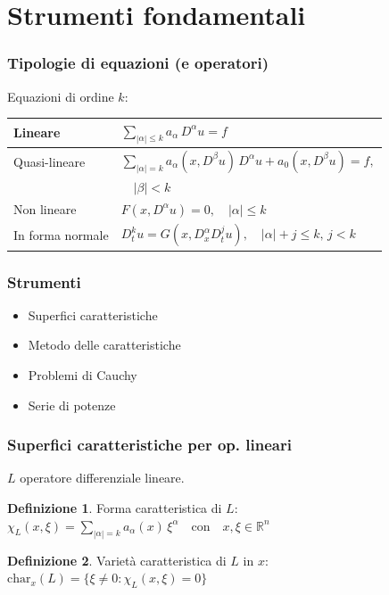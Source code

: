 \documentclass[serif,notheorems]{beamer}
\theoremstyle{definition} %
\newtheorem{definition}{Definizione}[section] %
\theoremstyle{remark}
\begin{document}
\section{Strumenti fondamentali}

\begin{frame}
\frametitle{Tipologie di equazioni (e operatori)}
Equazioni di ordine $k$:
\begin{table}
\renewcommand{\arraystretch}{2}
\begin{tabular}{l l} 
\hline \hline
 Lineare & $\sum_{|\alpha |\leq k} a_\alpha \, D^\alpha u = f$ \\
 \hline
 \vspace{-2mm}
 Quasi-lineare & $\sum_{|\alpha |= k} a_\alpha (x,D^\beta u) \, D^\alpha u +  a_0(x,D^\beta u)= f,$\\
 & $\quad |\beta |<k $ \\
 \hline
 Non lineare & $F(x,D^\alpha u)=0, \quad |\alpha | \leq k$ \\
 \hline
 In forma normale & $D_{t}^k u = G(x, D^\alpha_x D^j_t u), \quad |\alpha |+j \leq k, \, j < k$ \\
 \hline \hline
\end{tabular}
\end{table}
\end{frame}

\begin{frame}
\frametitle{Strumenti}
\begin{itemize}
\item Superfici caratteristiche
\item Metodo delle caratteristiche
\item Problemi di Cauchy
\item Serie di potenze
\end{itemize}

\end{frame}

\begin{frame}
\frametitle{Superfici caratteristiche per op. lineari}
$L$ operatore differenziale lineare.
\begin{definition}
Forma caratteristica di $L$:\\ $\chi_L(x,\xi)=\sum\limits_{|\alpha |= k} a_\alpha(x) \, \xi^\alpha \quad \text{con} \quad x,\xi \in \mathbb{R}^n$
\end{definition}

\begin{definition}
Varietà caratteristica di $L$ in $x$:\\ $\text{char}_x (L)= \{ \xi \neq 0 : \chi_L(x,\xi)=0 \}$
\end{definition}
\end{frame}
\end{document}

